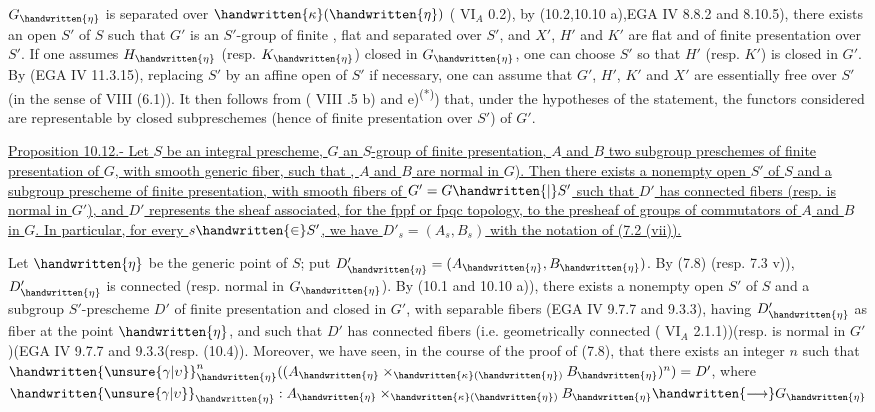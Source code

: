 $G_{\handwritten{\eta}}$ is separated over $\handwritten{\kappa}(\handwritten{\eta})$ ( $\mathrm{VI}_A$ 0.2), by (10.2,10.10 a),EGA IV 8.8.2 and 8.10.5), there exists an  open $S'$ of $S$ such that $G'$ is an $S'$-group of finite , flat and separated over $S'$, and $X'$, $H'$ and $K'$ are flat and of finite presentation over $S'$. If one assumes $H_{\handwritten{\eta}}$ (resp. $K_{\handwritten{\eta}}$) closed in $G_{\handwritten{\eta}}$, one can choose $S'$ so that $H'$ (resp. $K'$) is closed in $G'$. By (EGA IV 11.3.15), replacing $S'$ by an affine open of $S'$ if necessary, one can assume that $G'$, $H'$, $K'$ and $X'$ are essentially free over $S'$ (in the sense of  VIII (6.1)). It then follows from ( VIII .5 b) and e)\textsuperscript{(*)}) that, under the hypotheses of the statement, the functors considered are representable by closed subpreschemes (hence of finite presentation over $S'$) of $G'$.

\uline{Proposition 10.12.- Let $S$ be an integral prescheme, $G$ an  $S$-group of finite presentation, $A$ and $B$ two subgroup preschemes of finite presentation of $G$, with smooth generic fiber, such that ,  $A$ and $B$ are normal in $G$). Then there exists a nonempty open $S'$ of $S$ and a subgroup prescheme  of finite presentation, with smooth fibers  of $G'=G\handwritten{|}S'$\handwritten{,} such that $D'$ has  connected fibers (resp. is normal in $G'$), and $D'$ represents the sheaf associated, for the fppf or fpqc topology, to the presheaf of groups of commutators of $A$ and $B$ in $G$. In particular, for every $s\handwritten{\in}S'$, we have $D'_s=(A_s,B_s)$ with the notation of (7.2 (vii)).}

Let $\handwritten{\eta}$ be the generic point of $S$; put $D'_{\handwritten{\eta}}=(A_{\handwritten{\eta}},B_{\handwritten{\eta}})$. By (7.8) (resp. 7.3 v)), $D'_{\handwritten{\eta}}$ is connected (resp. normal in $G_{\handwritten{\eta}}$). By (10.1 and 10.10 a)), there exists a nonempty open $S'$ of $S$ and a subgroup $S'$-prescheme $D'$ of finite presentation and closed in $G'$, with separable fibers (EGA IV 9.7.7 and 9.3.3), having $D'_{\handwritten{\eta}}$ as fiber at the point $\handwritten{\eta}$, and such that $D'$ has connected fibers (i.e. geometrically connected ( $\mathrm{VI}_A$ 2.1.1))(resp. is normal in $G'$)(EGA IV 9.7.7 and 9.3.3\inserted{\handwritten{)}}(resp. (10.4)). Moreover, we have seen, in the course of the proof of (7.8), that there exists an integer $n$ such that $\handwritten{\unsure{\gamma|\upsilon}}_{\handwritten{\eta}}^n((A_{\handwritten{\eta}}\times_{\handwritten{\kappa}(\handwritten{\eta})}B_{\handwritten{\eta}})^n)=D'$, where $\handwritten{\unsure{\gamma|\upsilon}}_{\handwritten{\eta}}:A_{\handwritten{\eta}}\times_{\handwritten{\kappa}(\handwritten{\eta})}B_{\handwritten{\eta}}\handwritten{\longrightarrow}G_{\handwritten{\eta}}$

\par\noindent\handwritten{\rule{\linewidth}{0.3pt}}\par
{}\par
